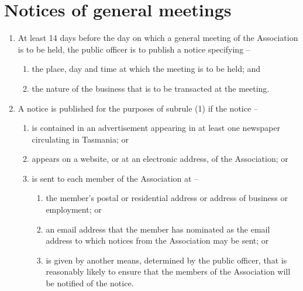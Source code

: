 \documentclass[a4paper,11pt]{article}
\begin{document}
\section{Notices of general meetings}
\begin{enumerate}
	\item At least 14 days before the day on which a general meeting of the Association is to be held, the public officer is to publish a notice specifying --
		\begin{enumerate}
			\item the place, day and time at which the meeting is to be held; and
			\item the nature of the business that is to be transacted at the meeting.
		\end{enumerate}
	
	\item A notice is published for the purposes of subrule (1) if the notice --
	\begin{enumerate}
		\item is contained in an advertisement appearing in at least one newspaper circulating in Tasmania; or
		\item appears on a website, or at an electronic address, of the Association; or
		\item is sent to each member of the Association at --
		\begin{enumerate}
			\item the member's postal or residential address or address of business or employment; or
			\item an email address that the member has nominated as the email address to which notices from the Association may be sent; or
			\item is given by another means, determined by the public officer, that is reasonably likely to ensure that the members of the Association will be notified of the notice.
		\end{enumerate}
	\end{enumerate}
\end{enumerate}
\end{document}
